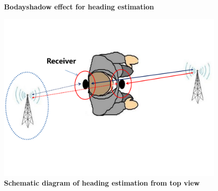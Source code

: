 \documentclass[conference]{IEEEtran}
\begin{document}
\begin{figure}[h]
\centering
{}
\label{fig:boday}
\caption{\bf Bodayshadow effect for heading estimation}
\end{figure}

    \begin{figure}[h]
      \centering
      \includegraphics[width=0.7 \linewidth]{pic/headingEstimation.pdf}
      \caption{\bf Schematic diagram of heading estimation from top view}
    \label{fig:headingEstimation}
    \end{figure}
\end{document}
